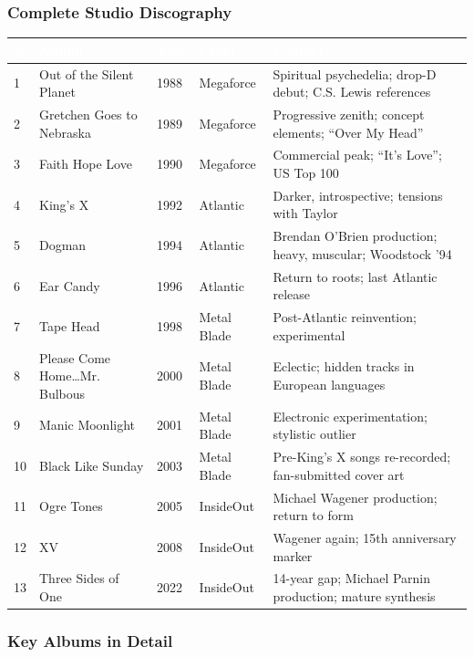 \documentclass[11pt,letterpaper]{article}
\newcommand{\tableheader}[1]{\textbf{\sffamily\textcolor{white}{#1}}}
\begin{document}
\subsubsection{Complete Studio Discography}

\begin{center}
\begin{tabularx}{\textwidth}{C{0.5cm}L{4.5cm}C{1cm}L{2.5cm}X}
\toprule
{}
\tableheader{\#} & \tableheader{Album} & \tableheader{Year} & \tableheader{Label} & \tableheader{Character} \\
 & Out of the Silent Planet & 1988 & Megaforce & Spiritual psychedelia; drop-D debut; C.S. Lewis references \\
2 & Gretchen Goes to Nebraska & 1989 & Megaforce & Progressive zenith; concept elements; ``Over My Head'' \\
3 & Faith Hope Love & 1990 & Megaforce & Commercial peak; ``It's Love''; US Top 100 \\
4 & King's X & 1992 & Atlantic & Darker, introspective; tensions with Taylor \\
5 & Dogman & 1994 & Atlantic & Brendan O'Brien production; heavy, muscular; Woodstock '94 \\
6 & Ear Candy & 1996 & Atlantic & Return to roots; last Atlantic release \\
7 & Tape Head & 1998 & Metal Blade & Post-Atlantic reinvention; experimental \\
8 & Please Come Home\ldots Mr. Bulbous & 2000 & Metal Blade & Eclectic; hidden tracks in European languages \\
9 & Manic Moonlight & 2001 & Metal Blade & Electronic experimentation; stylistic outlier \\
10 & Black Like Sunday & 2003 & Metal Blade & Pre-King's X songs re-recorded; fan-submitted cover art \\
11 & Ogre Tones & 2005 & InsideOut & Michael Wagener production; return to form \\
12 & XV & 2008 & InsideOut & Wagener again; 15th anniversary marker \\
13 & Three Sides of One & 2022 & InsideOut & 14-year gap; Michael Parnin production; mature synthesis \\
\bottomrule
\end{tabularx}
\end{center}

\subsubsection{Key Albums in Detail}
\end{document}
